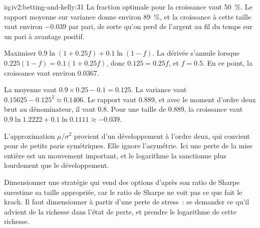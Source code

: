 \begin{solution}{iq:iv2:betting-and-kelly:31}
La fraction optimale pour la croissance vaut 50~\%. Le rapport moyenne sur variance donne environ 89~\%, et la croissance à cette taille vaut environ $-0.039$ par pari, de sorte qu'on perd de l'argent au fil du temps sur un pari à avantage positif.

Maximiser $0.9\ln(1 + 0.25f) + 0.1\ln(1 - f)$. La dérivée s'annule lorsque $0.225(1 - f) = 0.1(1 + 0.25f)$, donc $0.125 = 0.25f$, et $f = 0.5$. En ce point, la croissance vaut environ 0.0367.

La moyenne vaut $0.9 \times 0.25 - 0.1 = 0.125$. La variance vaut $0.15625 - 0.125^2 \approx 0.1406$. Le rapport vaut 0.889, et avec le moment d'ordre deux brut au dénominateur, il vaut 0.8. Pour une taille de 0.889, la croissance vaut $0.9\ln 1.2222 + 0.1\ln 0.1111 \approx -0.039$.

L'approximation $\mu/\sigma^2$ provient d'un développement à l'ordre deux, qui convient pour de petits paris symétriques. Elle ignore l'asymétrie. Ici une perte de la mise entière est un mouvement important, et le logarithme la sanctionne plus lourdement que le développement.

Dimensionner une stratégie qui vend des options d'après son ratio de Sharpe surestime sa taille appropriée, car le ratio de Sharpe ne voit pas ce que fait le krach. Il faut dimensionner à partir d'une perte de stress~: se demander ce qu'il advient de la richesse dans l'état de perte, et prendre le logarithme de cette richesse.

\end{solution}

